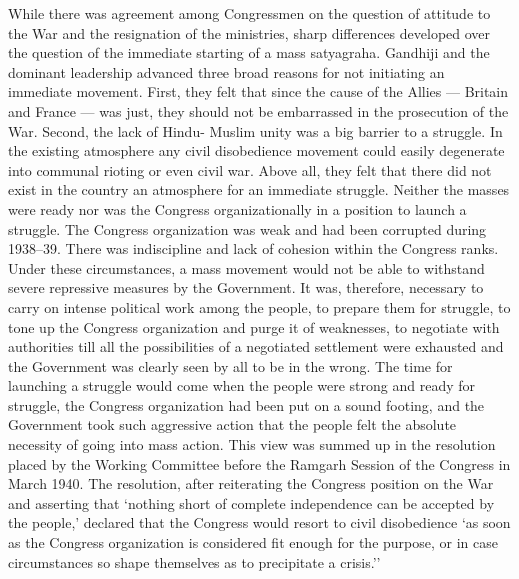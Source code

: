 \begin{multicols}{2}
While there was agreement among Congressmen on the question of attitude to the War and the resignation of the ministries, sharp differences developed over the question of the immediate starting of a mass satyagraha. Gandhiji and the dominant leadership advanced three broad reasons for not initiating an immediate movement. First, they felt that since the cause of the Allies --- Britain and France --- was just, they should not be embarrassed in the prosecution of the War. Second, the lack of Hindu- Muslim unity was a big barrier to a struggle. In the existing atmosphere any civil disobedience movement could easily degenerate into communal rioting or even civil war. Above all, they felt that there did not exist in the country an atmosphere for an immediate struggle. Neither the masses were ready nor was the Congress organizationally in a position to launch a struggle. The Congress organization was weak and had been corrupted during 1938--39. There was indiscipline and lack of cohesion within the Congress ranks. Under these circumstances, a mass movement would not be able to withstand severe repressive measures by the Government. It was, therefore, necessary to carry on intense political work among the people, to prepare them for struggle, to tone up the Congress organization and purge it of weaknesses, to negotiate with authorities till all the possibilities of a negotiated settlement were exhausted and the Government was clearly seen by all to be in the wrong. The time for launching a struggle would come when the people were strong and ready for struggle, the Congress organization had been put on a sound footing, and the Government took such aggressive action that the people felt the absolute necessity of going into mass action. This view was summed up in the resolution placed by the Working Committee before the Ramgarh Session of the Congress in March 1940. The resolution, after reiterating the Congress position on the War and asserting that `nothing short of complete independence can be accepted by the people,' declared that the Congress would resort to civil disobedience `as soon as the Congress organization is considered fit enough for the purpose, or in case circumstances so shape themselves as to precipitate a crisis.'' 


\end{multicols}
